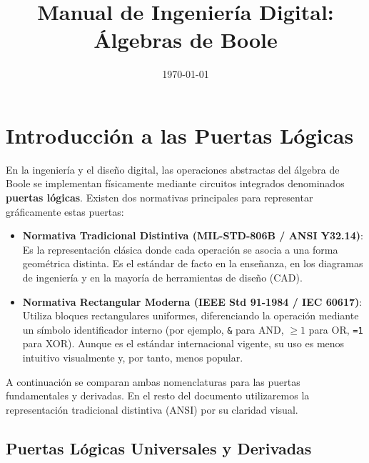 \documentclass[12pt,a4paper]{article}
\title{Manual de Ingeniería Digital: Álgebras de Boole}
\author{}
\date{\today}
\begin{document}
\maketitle

\tableofcontents
\newpage

\section{Introducción a las Puertas Lógicas}

En la ingeniería y el diseño digital, las operaciones abstractas del álgebra de Boole se implementan físicamente mediante circuitos integrados denominados \textbf{puertas lógicas}. 
Existen dos normativas principales para representar gráficamente estas puertas:

\begin{itemize}
    \item \textbf{Normativa Tradicional Distintiva (MIL-STD-806B / ANSI Y32.14)}: Es la representación clásica donde cada operación se asocia a una forma geométrica distinta. Es el estándar de facto en la enseñanza, en los diagramas de ingeniería y en la mayoría de herramientas de diseño (CAD).
    \item \textbf{Normativa Rectangular Moderna (IEEE Std 91-1984 / IEC 60617)}: Utiliza bloques rectangulares uniformes, diferenciando la operación mediante un símbolo identificador interno (por ejemplo, \texttt{\&} para AND, \texttt{$\ge 1$} para OR, \texttt{=1} para XOR). Aunque es el estándar internacional vigente, su uso es menos intuitivo visualmente y, por tanto, menos popular.
\end{itemize}

A continuación se comparan ambas nomenclaturas para las puertas fundamentales y derivadas. En el resto del documento utilizaremos la representación tradicional distintiva (ANSI) por su claridad visual.

\subsection{Puertas Lógicas Universales y Derivadas}
\end{document}
